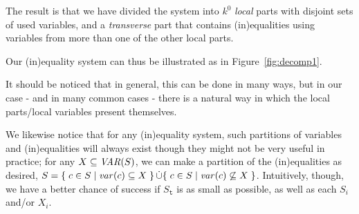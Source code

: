 The result is that we have divided the system into $k^0$ \emph{local} parts with disjoint sets of used variables, and a \emph{transverse} part that contains (in)equalities using variables from more than one of the other local parts. 

Our (in)equality system can thus be illustrated as in Figure~\ref{fig:decomp1}.

It should be noticed that in general, this can be done in many ways, but in our case - and in many common cases - there is a natural way in which the local parts/local variables present themselves. %
   
We likewise notice that for any (in)equality system, such partitions of variables and (in)equalities will always exist though they might not be very useful in practice; 
for any $X\subseteq \mathit{VAR}(S)$, we can make a partition of the (in)equalities as desired, $S = \{\;{c\in S}\;|\;{\mathit{var}(c)\subseteq X}\;\}\,\dot\cup \{\;{c\in S}\;|\;{\mathit{var}(c)\not\subseteq X}\;\}$.
Intuitively, though, we have a better chance of success if $S_\texttt{t}$ is as small as possible, as well as each $S_i$ and/or $X_i$.

